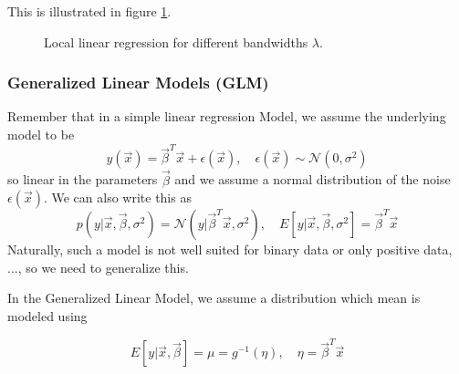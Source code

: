 This is illustrated in figure \ref{fig:local_linear_regression}.

\begin{figure}[!htb]
 \centering
 \hfill
 \caption{Local linear regression for different bandwidths $\lambda$.}
 \label{fig:local_linear_regression}
\end{figure}


\subsubsection{Generalized Linear Models (GLM)\skipthis}

Remember that in a simple linear regression Model, we assume the underlying model to be
\begin{equation}
    y(\vec{x}) = \vec{\beta}^T \vec{x} + \epsilon(\vec{x}), \quad \epsilon(\vec{x}) \sim \mathcal{N}(0, \sigma^2)
\end{equation}
so linear in the parameters $\vec{\beta}$ and we assume a normal distribution of the noise $\epsilon(\vec{x})$.
We can also write this as
\begin{equation}
    p(y | \vec{x}, \vec{\beta}, \sigma^2) = \mathcal{N}(y | \vec{\beta}^T \vec{x}, \sigma^2), \quad E{\left[ y | \vec{x}, \vec{\beta}, \sigma^2 \right]} = \vec{\beta}^T \vec{x}
\end{equation}
Naturally, such a model is not well suited for binary data or only positive data, ..., so we need to generalize this.


In the Generalized Linear Model, we assume a distribution which mean is modeled using

\begin{equation}
    E{\left[ y | \vec{x}, \vec{\beta} \right]} = \mu = g^{-1}(\eta), \quad \eta = \vec{\beta}^T \vec{x}
\end{equation}

